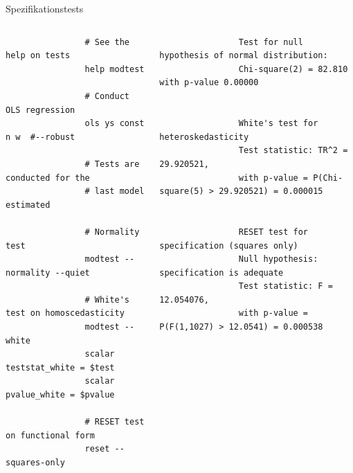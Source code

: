 \documentclass{beamer}[11pt]
\begin{document}
\begin{frame}[fragile]{Spezifikationstests}
	\begin{columns}[T] %
		\scriptsize
		\begin{column}{.45\textwidth}
			\begin{verbatim}
				# See the help on tests
				help modtest

				# Conduct OLS regression
				ols ys const n w  #--robust

				# Tests are conducted for the
				# last model estimated

				# Normality test
				modtest --normality --quiet

				# White's test on homoscedasticity
				modtest --white
				scalar teststat_white = $test
				scalar pvalue_white = $pvalue

				# RESET test on functional form
				reset --squares-only
			\end{verbatim}
		\end{column}

		\begin{column}{.55\textwidth}
			\tiny
			\begin{verbatim}
				Test for null hypothesis of normal distribution:
				Chi-square(2) = 82.810 with p-value 0.00000


				White's test for heteroskedasticity
				Test statistic: TR^2 = 29.920521,
				with p-value = P(Chi-square(5) > 29.920521) = 0.000015


				RESET test for specification (squares only)
				Null hypothesis: specification is adequate
				Test statistic: F = 12.054076,
				with p-value = P(F(1,1027) > 12.0541) = 0.000538
			\end{verbatim}
	  \end{column}
	\end{columns}
\end{frame}
\end{document}
